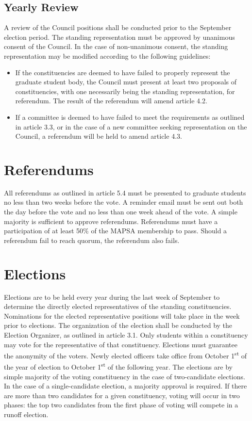 \documentclass[11pt]{article}
\begin{document}
	\subsection{Yearly Review}
	A review of the Council positions shall be conducted prior to the September election period. The standing representation must be approved by unanimous consent of the Council. In the case of non-unanimous consent, the standing representation may be modified according to the following guidelines:
	\begin{itemize}
		\item If the constituencies are deemed to have failed to properly represent the graduate student body, the Council must present at least two proposals of constituencies, with one necessarily being the standing representation, for referendum. The result of the referendum will amend article 4.2.
		\item If a committee is deemed to have failed to meet the requirements as outlined in article 3.3, or in the case of a new committee seeking representation on the Council, a referendum will be held to amend article 4.3.
	\end{itemize}
	\section{Referendums}
	All referendums as outlined in article 5.4 must be presented to graduate students no less than two weeks before the vote. A reminder email must be sent out both the day before the vote and no less than one week ahead of the vote. A simple majority is sufficient to approve referendums. Referendums must have a participation of at least 50\% of the MAPSA membership to pass. Should a referendum fail to reach quorum, the referendum also fails.
	
	\section{Elections}
	Elections are to be held every year during the last week of September to determine the directly elected representatives of the standing constituencies. Nominations for the elected representative positions will take place in the week prior to elections. The organization of the election shall be conducted by the Election Organizer, as outlined in article 3.1. Only students within a constituency may vote for the representative of that constituency. Elections must guarantee the anonymity of the voters. Newly elected officers take office from October 1\textsuperscript{st} of the year of election to October 1\textsuperscript{st} of the following year. The elections are by simple majority of the voting constituency in the case of two-candidate elections. In the case of a single-candidate election, a majority approval is required. If there are more than two candidates for a given constituency, voting will occur in two phases: the top two candidates from the first phase of voting will compete in a runoff election.
	
\end{document}
